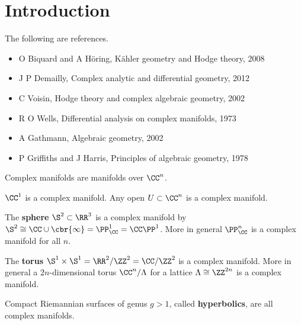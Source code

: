 





\setcounter{section}{0}

\section{Introduction}


The following are references.
\begin{itemize}
\item O Biquard and A H\"oring, K\"ahler geometry and Hodge theory, 2008
\item J P Demailly, Complex analytic and differential geometry, 2012
\item C Voisin, Hodge theory and complex algebraic geometry, 2002
\item R O Wells, Differential analysis on complex manifolds, 1973
\item A Gathmann, Algebraic geometry, 2002
\item P Griffiths and J Harris, Principles of algebraic geometry, 1978
\end{itemize}

Complex manifolds are manifolds over $ \CC^n $.

\begin{example}
$ \CC^1 $ is a complex manifold. Any open $ U \subset \CC^n $ is a complex manifold.
\end{example}

\begin{example}
The \textbf{sphere} $ \S^2 \subset \RR^3 $ is a complex manifold by $ \S^2 \cong \CC \cup \cbr{\infty} = \PP_\CC^1 = \CC\PP^1 $. More in general $ \PP_\CC^n $ is a complex manifold for all $ n $.
\end{example}

\begin{example}
The \textbf{torus} $ \S^1 \times \S^1 = \RR^2 / \ZZ^2 = \CC / \ZZ^2 $ is a complex manifold. More in general a $ 2n $-dimensional torus $ \CC^n / \Lambda $ for a lattice $ \Lambda \cong \ZZ^{2n} $ is a complex manifold.
\end{example}

\begin{example}
Compact Riemannian surfaces of genus $ g > 1 $, called \textbf{hyperbolics}, are all complex manifolds.
\end{example}

